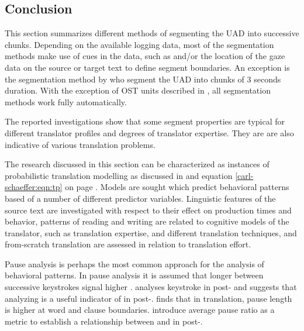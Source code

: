 \documentclass[output=paper]{LSP/langsci}
\begin{document}
\subsection{Conclusion}
\label{carl-schaeffer:sec:3.5}

This section summarizes different methods of segmenting the UAD into successive chunks. Depending on the available logging data, most of the segmentation methods make use of cues in the data, such as   and/or the location of the gaze data on the source or target text to define segment boundaries. An exception is the segmentation method by \citet{Laubli2016} who segment the UAD into chunks of 3 seconds duration. With the exception of OST units described in , all segmentation methods work fully automatically.

The reported investigations show that some segment properties are typical for different translator profiles and degrees of translator expertise. They are are also indicative of various translation problems.

The research discussed in this section can be characterized as instances of probabilistic translation modelling as discussed in  and equation \ref{carl-schaeffer:eqn:tp} on page \pageref{carl-schaeffer:eqn:tp}. Models are sought which predict behavioral patterns based of a number of different predictor variables. Linguistic features of the source text are investigated with respect to their effect on production times and  behavior, patterns of reading and writing are related to cognitive models of the translator, such as translation expertise, and different translation techniques,  and from-scratch translation are assessed in relation to translation effort.

Pause analysis is perhaps the most common approach for the analysis of behavioral patterns. In pause analysis it is assumed that longer  between successive keystrokes signal higher . \citet{Obrien2006} analyses keystroke  in post- and suggests that analyzing  is a useful indicator of  in post-. \citet{Immonen2006} finds that in translation, pause length is higher at word and clause boundaries. \citet{Lacruz2012} introduce average pause ratio as a metric to establish a relationship between  and  in post-. 
\end{document}
